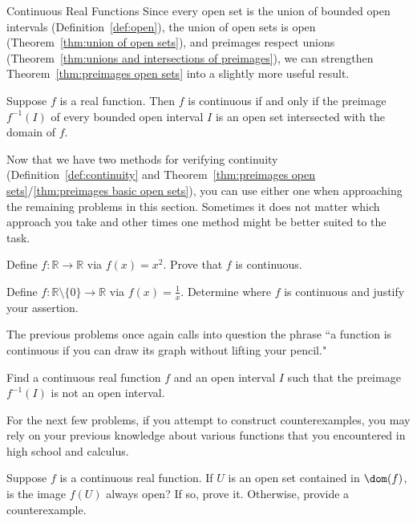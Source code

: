 \begin{section}{Continuous Real Functions}
Since every open set is the union of bounded open intervals (Definition~\ref{def:open}), the union of open sets is open (Theorem~\ref{thm:union of open sets}), and preimages respect unions (Theorem~\ref{thm:unions and intersections of preimages}), we can strengthen Theorem~\ref{thm:preimages open sets} into a slightly more useful result.  

\begin{theorem}\label{thm:preimages basic open sets}
Suppose $f$ is a real function. Then $f$ is continuous if and only if the preimage $f^{-1}(I)$ of every bounded open interval $I$ is an open set intersected with the domain of $f$.
\end{theorem}

Now that we have two methods for verifying continuity (Definition~\ref{def:continuity} and Theorem~\ref{thm:preimages open sets}/\ref{thm:preimages basic open sets}), you can use either one when approaching the remaining problems in this section. Sometimes it does not matter which approach you take and other times one method might be better suited to the task.

\begin{problem}
Define $f:\mathbb{R}\to\mathbb{R}$ via $f(x)=x^2$. Prove that $f$ is continuous.
\end{problem}

\begin{problem}
Define $f:\mathbb{R}\setminus\{0\}\to\mathbb{R}$ via $f(x)=\frac{1}{x}$. Determine where $f$ is continuous and justify your assertion.
\end{problem}

The previous problems once again calls into question the phrase ``a function is continuous if you can draw its graph without lifting your pencil."

\begin{problem}
Find a continuous real function $f$ and an open interval $I$ such that the preimage $f^{-1}(I)$ is not an open interval.
\end{problem}

For the next few problems, if you attempt to construct counterexamples, you may rely on your previous knowledge about various functions that you encountered in high school and calculus.

\begin{problem}
Suppose $f$ is a continuous real function. If $U$ is an open set contained in $\dom(f)$, is the image $f(U)$ always open?  If so, prove it.  Otherwise, provide a counterexample.
\end{problem}


\end{section}
